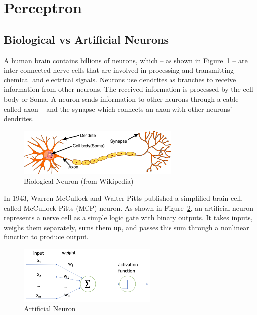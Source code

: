 
\section{Perceptron}\label{sec:perceptron}


\subsection*{Biological vs Artificial Neurons}

A human brain contains billions of neurons, which -- as shown in Figure~\ref{fig:bioneuron} -- are inter-connected nerve cells that are involved in processing and transmitting chemical and electrical signals. Neurons use 
dendrites as branches to receive information from other neurons. The received information is processed by 
the cell body or Soma. A neuron sends information to other neurons through a cable -- called axon -- and the synapse which connects an axon with other neurons' dendrites. 

\begin{figure}[!htbp]
    \centering
    \includegraphics[width=0.7\textwidth]{images/deepLearning/Perceptron/biologicalNeuron.png}
    \caption{Biological Neuron (from Wikipedia)}
    \label{fig:bioneuron}
\end{figure}

In 1943, Warren McCullock and Walter Pitts published a simplified brain cell,  called McCullock-Pitts (MCP) neuron. As shown in Figure~\ref{fig:artneuron}, an artificial neuron represents a nerve cell as a simple logic gate with binary outputs. It takes inputs, weighs them separately, sums them up, and passes this sum through a nonlinear function to produce output. 

\begin{figure}[!htbp]
    \centering
    \includegraphics[width=0.6\textwidth]{images/deepLearning/Perceptron/artificialNeuron2.png}
    \caption{Artificial Neuron}
    \label{fig:artneuron}
\end{figure}

